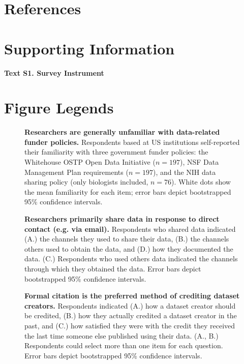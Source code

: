 \documentclass[10pt]{article}
\begin{document}
\section*{References}



\section*{Supporting Information}
{\bf Text S1. Survey Instrument}


\section*{Figure Legends}

\begin{figure}[!ht]
\begin{center}
\end{center}
\caption{
{\bf Researchers are generally unfamiliar with data-related funder policies.}
Respondents based at US institutions self-reported their familiarity with three government funder policies: the Whitehouse OSTP Open Data Initiative ($n=197$), NSF Data Management Plan requirements ($n=197$), and the NIH data sharing policy (only biologists included, $n=76$). 
White dots show the mean familiarity for each item; error bars depict bootstrapped 95\% confidence intervals.
}
\label{fig:policy_knowledge}
\end{figure}


\begin{figure}[!ht]
\begin{center}
\end{center}
\caption{
{\bf Researchers primarily share data in response to direct contact (e.g. via email).}
Respondents who shared data indicated (A.) the channels they used to share their data, (B.) the channels others used to obtain the data, and (D.) how they documented the data.
(C.) Respondents who used others data indicated the channels through which they obtained the data.
Error bars depict bootstrapped 95\% confidence intervals.
}
\label{fig:sharing}
\end{figure}


\begin{figure}[!ht]
\begin{center}
\end{center}
\caption{
{\bf Formal citation is the preferred method of crediting dataset creators.}
Respondents indicated (A.) how a dataset creator should be credited, (B.) how they actually credited a dataset creator in the past, and (C.) how satisfied they were with the credit they received the last time someone else published using their data.  (A., B.) Respondents could select more than one item for each question.
Error bars depict bootstrapped 95\% confidence intervals.
} 
\label{fig:credit}
\end{figure}
\end{document}
